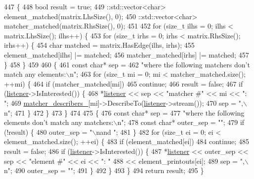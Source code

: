 \begin{DoxyCode}
447                                          \{
448   \textcolor{keywordtype}{bool} result = \textcolor{keyword}{true};
449   ::std::vector<char> element\_matched(matrix.LhsSize(), 0);
450   ::std::vector<char> matcher\_matched(matrix.RhsSize(), 0);
451 
452   \textcolor{keywordflow}{for} (\textcolor{keywordtype}{size\_t} ilhs = 0; ilhs < matrix.LhsSize(); ilhs++) \{
453     \textcolor{keywordflow}{for} (\textcolor{keywordtype}{size\_t} irhs = 0; irhs < matrix.RhsSize(); irhs++) \{
454       \textcolor{keywordtype}{char} matched = matrix.HasEdge(ilhs, irhs);
455       element\_matched[ilhs] |= matched;
456       matcher\_matched[irhs] |= matched;
457     \}
458   \}
459 
460   \{
461     \textcolor{keyword}{const} \textcolor{keywordtype}{char}* sep =
462         \textcolor{stringliteral}{"where the following matchers don't match any elements:\(\backslash\)n"};
463     \textcolor{keywordflow}{for} (\textcolor{keywordtype}{size\_t} mi = 0; mi < matcher\_matched.size(); ++mi) \{
464       \textcolor{keywordflow}{if} (matcher\_matched[mi])
465         \textcolor{keywordflow}{continue};
466       result = \textcolor{keyword}{false};
467       \textcolor{keywordflow}{if} (\hyperlink{namespaceinteractive__marker_a0e579ab555212bb5e2c9f8a675b7618a}{listener}->IsInterested()) \{
468         *\hyperlink{namespaceinteractive__marker_a0e579ab555212bb5e2c9f8a675b7618a}{listener} << sep << \textcolor{stringliteral}{"matcher #"} << mi << \textcolor{stringliteral}{": "};
469         \hyperlink{classtesting_1_1internal_1_1UnorderedElementsAreMatcherImplBase_af416e45f53ebdfe4bccd710142db1600}{matcher\_describers\_}[mi]->DescribeTo(\hyperlink{namespaceinteractive__marker_a0e579ab555212bb5e2c9f8a675b7618a}{listener}->stream());
470         sep = \textcolor{stringliteral}{",\(\backslash\)n"};
471       \}
472     \}
473   \}
474 
475   \{
476     \textcolor{keyword}{const} \textcolor{keywordtype}{char}* sep =
477         \textcolor{stringliteral}{"where the following elements don't match any matchers:\(\backslash\)n"};
478     \textcolor{keyword}{const} \textcolor{keywordtype}{char}* outer\_sep = \textcolor{stringliteral}{""};
479     \textcolor{keywordflow}{if} (!result) \{
480       outer\_sep = \textcolor{stringliteral}{"\(\backslash\)nand "};
481     \}
482     \textcolor{keywordflow}{for} (\textcolor{keywordtype}{size\_t} ei = 0; ei < element\_matched.size(); ++ei) \{
483       \textcolor{keywordflow}{if} (element\_matched[ei])
484         \textcolor{keywordflow}{continue};
485       result = \textcolor{keyword}{false};
486       \textcolor{keywordflow}{if} (\hyperlink{namespaceinteractive__marker_a0e579ab555212bb5e2c9f8a675b7618a}{listener}->IsInterested()) \{
487         *\hyperlink{namespaceinteractive__marker_a0e579ab555212bb5e2c9f8a675b7618a}{listener} << outer\_sep << sep << \textcolor{stringliteral}{"element #"} << ei << \textcolor{stringliteral}{": "}
488                   << element\_printouts[ei];
489         sep = \textcolor{stringliteral}{",\(\backslash\)n"};
490         outer\_sep = \textcolor{stringliteral}{""};
491       \}
492     \}
493   \}
494   \textcolor{keywordflow}{return} result;
495 \}
\end{DoxyCode}
